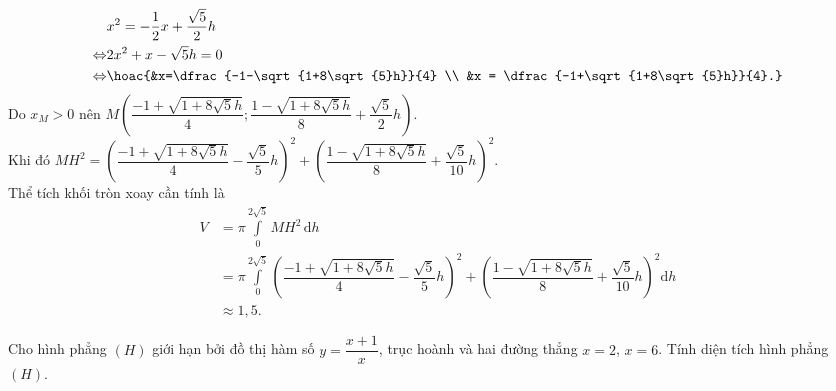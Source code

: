 \begin{bt}
{		\allowdisplaybreaks
		\begin{align*}
			&x^2 = -\dfrac{1}{2}x + \dfrac{\sqrt{5}}{2}h \\
			\Leftrightarrow&2x^2 + x - \sqrt{5}h = 0 \\
			\Leftrightarrow& \hoac{&x=\dfrac{-1-\sqrt{1+8\sqrt{5}h}}{4} \\ &x = \dfrac{-1+\sqrt{1+8\sqrt{5}h}}{4}.}
		\end{align*}
		Do $x_M>0$ nên $M\left(\dfrac{-1+\sqrt{1+8\sqrt{5}h}}{4};\dfrac{1-\sqrt{1+8\sqrt{5}h}}{8}+\dfrac{\sqrt{5}}{2}h\right)$. \\
		Khi đó $MH^2 = \left(\dfrac{-1+\sqrt{1+8\sqrt{5}h}}{4}-\dfrac{\sqrt{5}}{5}h\right)^2 + \left(\dfrac{1-\sqrt{1+8\sqrt{5}h}}{8}+\dfrac{\sqrt{5}}{10}h\right)^2$. \\
		Thể tích khối tròn xoay cần tính là
		\allowdisplaybreaks
		\begin{align*}
			V &= \displaystyle \pi\int\limits_{0}^{2\sqrt{5}}MH^2\mathrm{\,d}h \\
			&= \displaystyle \pi\int\limits_{0}^{2\sqrt{5}}\left(\dfrac{-1+\sqrt{1+8\sqrt{5}h}}{4}-\dfrac{\sqrt{5}}{5}h\right)^2 + \left(\dfrac{1-\sqrt{1+8\sqrt{5}h}}{8}+\dfrac{\sqrt{5}}{10}h\right)^2\mathrm{d}h \\
			&\approx 1{,}5.
		\end{align*}
	}
\end{bt}

\begin{bt}%

	Cho hình phẳng $(H)$ giới hạn bởi đồ thị hàm số $y=\dfrac{x+1}{x}$, trục hoành và hai đường thẳng $x=2$, $x=6$. Tính diện tích hình phẳng $(H)$.
\end{bt}

